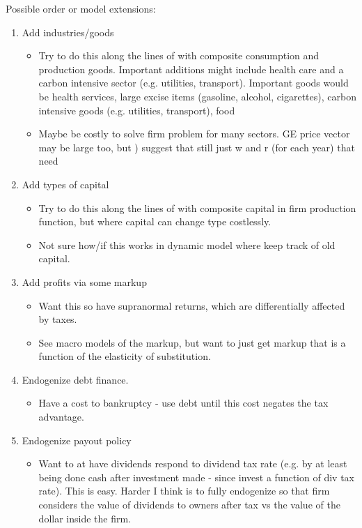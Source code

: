 \documentclass[article,11pt,letterpaper,fleqn]{article}
\theoremstyle{definition}
\numberwithin{equation}{section}
\newcommand{\cn}{\citeasnoun} %
\begin{document}
Possible order or model extensions:
\begin{enumerate}
\item Add industries/goods	
	\begin{itemize}
	\item Try to do this along the lines of \cn{FG1993} with composite consumption and production goods.  Important additions might include health care and a carbon intensive sector (e.g. utilities, transport).  Important goods would be health services, large excise items (gasoline, alcohol, cigarettes), carbon intensive goods (e.g. utilities, transport), food 	
	\item Maybe be costly to solve firm problem for many sectors.  GE price vector may be large too, but \cn{FG1993}) suggest that still just w and r (for each year) that need
	\end{itemize}
\item Add types of capital	
	\begin{itemize}
	\item Try to do this along the lines of \cn{FG1993} with composite capital in firm production function, but where capital can change type costlessly.	
	\item Not sure how/if this works in dynamic model where keep track of old capital.
	\end{itemize}
\item Add profits via some markup	
	\begin{itemize}
	\item Want this so have supranormal returns, which are differentially affected by taxes. 
	\item See macro models of the markup, but want to just get markup that is a function of the elasticity of substitution.	
	\end{itemize}
\item Endogenize debt finance.
	\begin{itemize}
	\item Have a cost to bankruptcy - use debt until this cost negates the tax advantage.
	\end{itemize}	
\item Endogenize payout policy	
	\begin{itemize}
	\item Want to at have dividends respond to dividend tax rate (e.g. by at least being done cash after investment made - since invest a function of div tax rate). This is easy.  Harder I think is to fully endogenize so that firm considers the value of dividends to owners after tax vs the value of the dollar inside the firm.

\end{itemize}
\end{enumerate}
\end{document}
